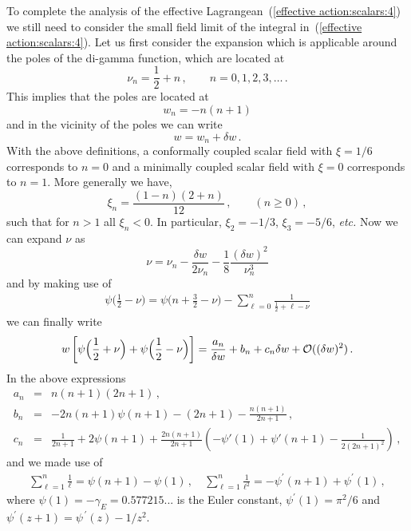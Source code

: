 \documentclass[aps,12pt,superscriptaddress,preprintnumbers,
                secnumarabic,nofootinbib,showpacs]{revtex4}
\begin{document}
 To complete the analysis of the effective
Lagrangean~(\ref{effective action:scalars:4}) we still need to
consider the small field limit of the integral in~(\ref{effective
action:scalars:4}). Let us first consider the expansion which is
applicable around the poles of the di-gamma function, which are
located at
\begin{equation}
  \nu_n = \frac12 + n\,,\qquad n=0,1,2,3,\dots
\,.
\label{poles of psi}
\end{equation}
This implies that the poles are located at
\begin{equation}
  w_n = -n(n+1)
\label{w_n}
\end{equation}
and in the vicinity of the poles we can write
\begin{equation}
  w = w_n +\delta w
\,.
\label{w}
\end{equation}
With the above definitions, a conformally coupled scalar field with $\xi= 1/6$
corresponds to $n=0$ and a minimally coupled scalar field
with $\xi = 0$ corresponds to $n = 1$. More generally we have,
\begin{equation}
\xi_n = \frac{(1-n)(2+n)}{12}
\,, \qquad (n\geq 0)
\,,
\label{xi_n}
\end{equation}
such that for $n>1$ all $\xi_n<0$.
In particular, $\xi_2 = -1/3$, $\xi_3 = -5/6$, {\it etc.}
Now we can expand $\nu$ as
\begin{equation}
\nu = \nu_n - \frac{\delta w}{2\nu_n}-\frac18\frac{(\delta
w)^2}{\nu_n^{3}}
\end{equation}
and by making use of
\begin{eqnarray}
 \psi\Big(\frac12 -\nu\Big) =  \psi\Big(n + \frac32 - \nu\Big)
                             - \sum_{\ell=0}^{n} \frac{1}{\frac12 + \ell - \nu}
\label{psi-log}
\end{eqnarray}
we can finally write
\begin{eqnarray}
 w\left[\psi\Big(\frac12 + \nu\Big) + \psi\Big(\frac12
 -\nu\Big)\right]
         = \frac{a_n}{\delta w} + b_n + c_n\delta w
   + {\cal O}((\delta w)^2)
\,.
\label{psi-log:2}
\end{eqnarray}
In the above expressions
\begin{eqnarray}
a_n & = & n(n+1)(2n+1)
\,,
\nonumber\\
b_n & = & -2n(n+1)\psi(n+1)-(2n+1)-\frac{n(n+1)}{2n+1}
\,,
\nonumber\\
c_n & = & \frac{1}{2n+1}+2\psi(n+1)
     +\frac{2n(n+1)}{2n+1}\left(-\psi'(1)+\psi'(n+1)-\frac{1}{2(2n+1)^2}\right)
\,,
\label{abc}
\end{eqnarray}
and we made use of
\begin{eqnarray}
 \sum_{\ell=1}^n\frac{1}{\ell} = \psi(n+1)-\psi(1)
\,,\quad
 \sum_{\ell=1}^n\frac{1}{\ell^2} = -\psi^\prime(n+1)+\psi^\prime(1)
\,,
\label{psi-log:3}
\end{eqnarray}
where $\psi(1)=-\gamma_E = 0.577215...$ is the Euler constant,
$\psi^\prime(1) = \pi^2/6$ and $\psi^\prime(z+1) = \psi^{\,\prime}(z) - 1/z^2$.
\end{document}
